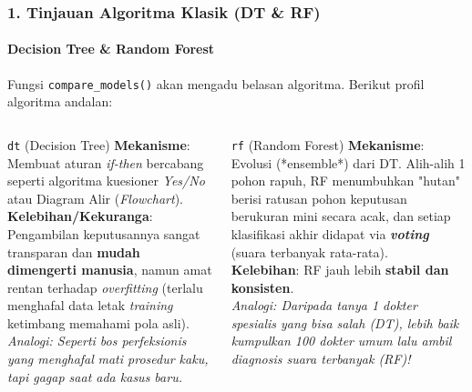 \documentclass[t,aspectratio=169,xcolor=dvipsnames]{beamer}
\begin{document}
\begin{frame}
    \frametitle{1. Tinjauan Algoritma Klasik (DT \& RF)}
    \framesubtitle{Decision Tree \& Random Forest}
    \scriptsize
    Fungsi \texttt{compare\_models()} akan mengadu belasan algoritma. Berikut profil algoritma andalan:
    \vspace{0.2cm}
    \begin{columns}[T]
        \begin{block}{\texttt{dt} (Decision Tree)}
            \textbf{Mekanisme}: Membuat aturan \textit{if-then} bercabang seperti algoritma kuesioner \textit{Yes/No} atau Diagram Alir (\textit{Flowchart}).\\
            \vspace{0.2cm}
            \textbf{Kelebihan/Kekuranga}: Pengambilan keputusannya sangat transparan dan \textbf{mudah dimengerti manusia}, namun amat rentan terhadap \textit{overfitting} (terlalu menghafal data letak \textit{training} ketimbang memahami pola asli).\\
            \vspace{0.2cm}
            \colorbox{orange!20}{\textit{Analogi: Seperti bos perfeksionis yang menghafal}}
            \colorbox{orange!20}{\textit{mati prosedur kaku, tapi gagap saat ada kasus baru.}}
        \end{block}

        \begin{block}{\texttt{rf} (Random Forest)}
            \textbf{Mekanisme}: Evolusi (*ensemble*) dari DT. Alih-alih 1 pohon rapuh, RF menumbuhkan "hutan" berisi ratusan pohon keputusan berukuran mini secara acak, dan setiap klasifikasi akhir didapat via \textbf{\textit{voting}} (suara terbanyak rata-rata).\\
            \vspace{0.2cm}
            \textbf{Kelebihan}: RF jauh lebih \textbf{stabil dan konsisten}.\\
            \vspace{0.2cm}
            \colorbox{nyublue!20}{\textit{Analogi: Daripada tanya 1 dokter spesialis yang}}
            \colorbox{nyublue!20}{\textit{bisa salah (DT), lebih baik kumpulkan 100 dokter}}
            \colorbox{nyublue!20}{\textit{umum lalu ambil diagnosis suara terbanyak (RF)!}}
        \end{block}
    \end{columns}
\end{frame}
\end{document}
